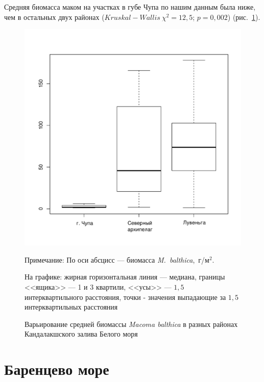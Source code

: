 Средняя биомасса маком на участках в губе Чупа по нашим данным была ниже, чем в остальных двух районах ($Kruskal-Wallis~\chi^2 = 12,5$; $p = 0,002$) (рис.~\ref{ris:B_region_White}).
	\begin{figure}[p]
	\begin{center}	
		\includegraphics[height=0.5\textheight]{../All_B/Bmean_region_White1.pdf}
	\end{center}
	\caption{Варьирование средней биомассы {\it Macoma balthica} в разных районах Кандалакшского залива Белого моря}
	{\footnotesize Примечание: По оси абсцисс --- биомасса {\it M.~balthica},~г/м$^2$.

	На графике: жирная горизонтальная линия --- медиана, границы <<ящика>> --- 1 и 3 квартили, <<усы>> --- $1,5$ интерквартильного расстояния, точки - значения выпадающие за $1,5$ интерквартильных расстояния}
	\label{ris:B_region_White}
	\end{figure}

\afterpage{\clearpage}

	\section{Баренцево море}

